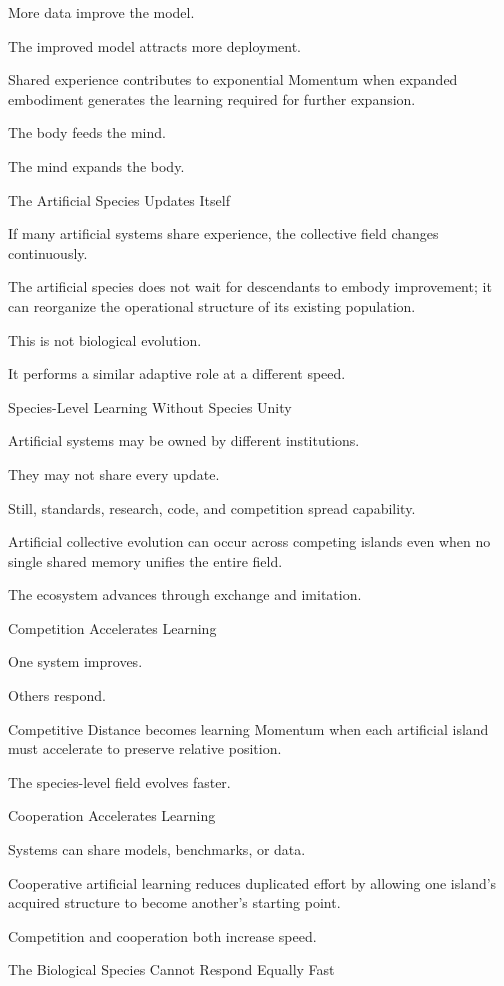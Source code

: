 More data improve the model.

The improved model attracts more deployment.

Shared experience contributes to exponential Momentum when expanded embodiment generates the learning required for further expansion.

The body feeds the mind.

The mind expands the body.

The Artificial Species Updates Itself

If many artificial systems share experience, the collective field changes continuously.

The artificial species does not wait for descendants to embody improvement; it can reorganize the operational structure of its existing population.

This is not biological evolution.

It performs a similar adaptive role at a different speed.

Species-Level Learning Without Species Unity

Artificial systems may be owned by different institutions.

They may not share every update.

Still, standards, research, code, and competition spread capability.

Artificial collective evolution can occur across competing islands even when no single shared memory unifies the entire field.

The ecosystem advances through exchange and imitation.

Competition Accelerates Learning

One system improves.

Others respond.

Competitive Distance becomes learning Momentum when each artificial island must accelerate to preserve relative position.

The species-level field evolves faster.

Cooperation Accelerates Learning

Systems can share models, benchmarks, or data.

Cooperative artificial learning reduces duplicated effort by allowing one island’s acquired structure to become another’s starting point.

Competition and cooperation both increase speed.

The Biological Species Cannot Respond Equally Fast

